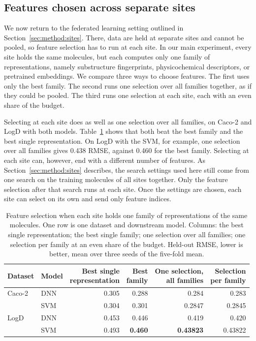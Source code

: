 \subsection{Features chosen across separate sites}\label{sec:method:results_sites}

We now return to the federated learning setting outlined in Section~\ref{sec:method:sites}. There, data are held at separate sites and cannot be pooled, so feature selection has to run at each site. In our main experiment, every site holds the same molecules, but each computes only one family of representations, namely substructure fingerprints, physicochemical descriptors, or pretrained embeddings. We compare three ways to choose features. The first uses only the best family. The second runs one selection over all families together, as if they could be pooled. The third runs one selection at each site, each with an even share of the budget.

Selecting at each site does as well as one selection over all families, on Caco-2 and LogD with both models. Table~\ref{tab:method:family_sites} shows that both beat the best family and the best single representation. On LogD with the SVM, for example, one selection over all families gives 0.438 RMSE, against 0.460 for the best family. Selecting at each site can, however, end with a different number of features. As Section~\ref{sec:method:sites} describes, the search settings used here still come from one search on the training molecules of all sites together. Only the feature selection after that search runs at each site. Once the settings are chosen, each site can select on its own and send only feature indices.

\begin{table}[htbp]
\centering
\begin{tabular}{@{}llrrrr@{}}
\toprule
Dataset & Model & \makecell[r]{Best single\\representation} & \makecell[r]{Best\\family} & \makecell[r]{One selection,\\all families} & \makecell[r]{Selection\\per family} \\
\midrule
Caco-2 & DNN & 0.305 & 0.288 & 0.284 & 0.283 \\
 & SVM & 0.304 & 0.301 & 0.2847 & 0.2845 \\
LogD & DNN & 0.453 & 0.446 & 0.419 & 0.420 \\
 & SVM & 0.493 & \textbf{0.460} & \textbf{0.43823} & 0.43822 \\
\bottomrule
\end{tabular}
\caption[Feature selection when each site holds one family of representations.]{Feature selection when each site holds one family of representations of the same molecules. One row is one dataset and downstream model. Columns: the best single representation; the best single family; one selection over all families; one selection per family at an even share of the budget. Held-out RMSE, lower is better, mean over three seeds of the five-fold mean.}
\label{tab:method:family_sites}
\end{table}

